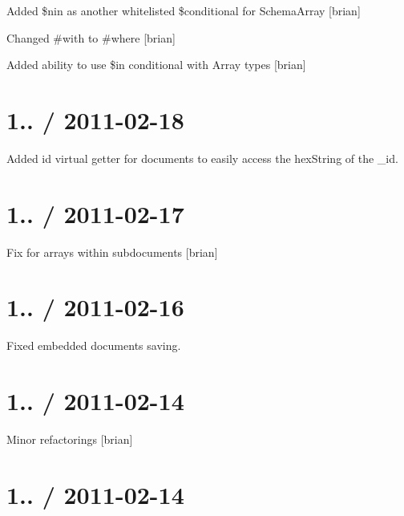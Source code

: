\begin{DoxyItemize}
\item Added \$nin as another whitelisted \$conditional for Schema\+Array \mbox{[}brian\mbox{]}
\item Changed \#with to \#where \mbox{[}brian\mbox{]}
\item Added ability to use \$in conditional with Array types \mbox{[}brian\mbox{]}
\end{DoxyItemize}

\section*{1.. / 2011-\/02-\/18 }


\begin{DoxyItemize}
\item Added {\ttfamily id} virtual getter for documents to easily access the hex\+String of the {\ttfamily \+\_\+id}.
\end{DoxyItemize}

\section*{1.. / 2011-\/02-\/17 }


\begin{DoxyItemize}
\item Fix for arrays within subdocuments \mbox{[}brian\mbox{]}
\end{DoxyItemize}

\section*{1.. / 2011-\/02-\/16 }


\begin{DoxyItemize}
\item Fixed embedded documents saving.
\end{DoxyItemize}

\section*{1.. / 2011-\/02-\/14 }


\begin{DoxyItemize}
\item Minor refactorings \mbox{[}brian\mbox{]}
\end{DoxyItemize}

\section*{1.. / 2011-\/02-\/14 }


